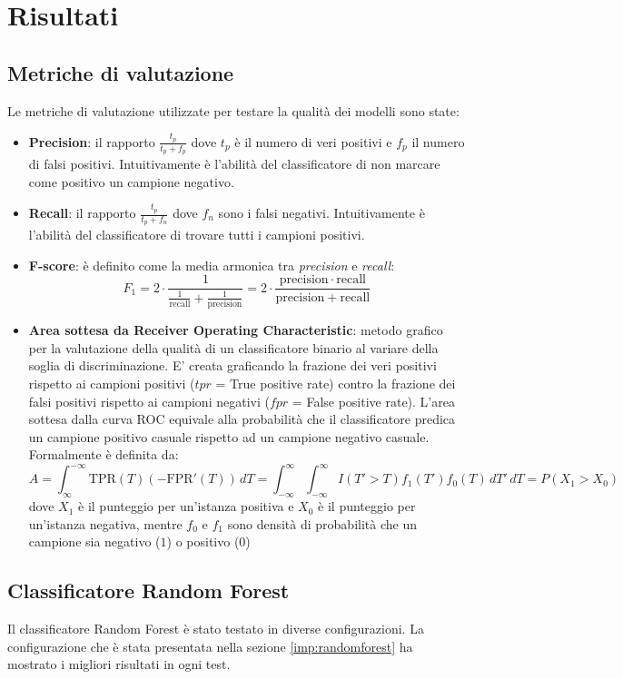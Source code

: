 
\chapter{Risultati}
\label{risultati}

\section{Metriche di valutazione}
Le metriche di valutazione utilizzate per testare la qualità dei modelli sono state:
\begin{itemize}
\item \textbf{Precision}: il rapporto $\frac{t_p}{t_p+f_p}$ dove $t_p$ è il numero di veri positivi e $f_p$ il numero di falsi positivi. Intuitivamente è l'abilità del classificatore di non marcare come positivo un campione negativo.
\item \textbf{Recall}: il rapporto $\frac{t_p}{t_p+f_n}$  dove $f_n$ sono i falsi negativi. Intuitivamente è l'abilità del classificatore di trovare tutti i campioni positivi.
\item \textbf{F-score}: è definito come la media armonica tra \textit{precision} e \textit{recall}: 
\[F_1 = 2 \cdot \frac{1}{\tfrac{1}{\mathrm{recall}} + \tfrac{1}{\mathrm{precision}}} = 2 \cdot \frac{\mathrm{precision} \cdot \mathrm{recall}}{\mathrm{precision} + \mathrm{recall}}\]
\item \textbf{Area sottesa da Receiver Operating Characteristic}:  metodo grafico per la valutazione della qualità di un classificatore binario al variare della soglia di discriminazione. E' creata graficando la frazione dei veri positivi rispetto ai campioni positivi ($tpr$ = True positive rate) contro la frazione dei falsi positivi rispetto ai campioni negativi ($fpr$ = False positive rate). L'area sottesa dalla curva ROC equivale alla probabilità che il classificatore predica un campione positivo casuale rispetto ad un campione negativo casuale. Formalmente è definita da:
\[ A = \int_{\infty}^{-\infty} \mbox{TPR}(T) \left(-\mbox{FPR}'(T)\right) \, dT = \int_{-\infty}^{\infty} \int_{-\infty}^{\infty} I(T'>T)f_1(T') f_0(T) \, dT' \, dT = P(X_1 > X_0)\]
dove 
$X_{1}$ è il punteggio per un'istanza positiva e $X_{0}$ è il punteggio per un'istanza negativa, mentre $f_{0}$ e $f_{1}$ sono densità di probabilità che un campione sia negativo ($1$) o positivo ($0$)
\end{itemize}

\section{Classificatore Random Forest}
Il classificatore Random Forest è stato testato in diverse configurazioni. La configurazione che è stata presentata nella sezione \ref{imp:randomforest} ha mostrato i migliori risultati in ogni test.

